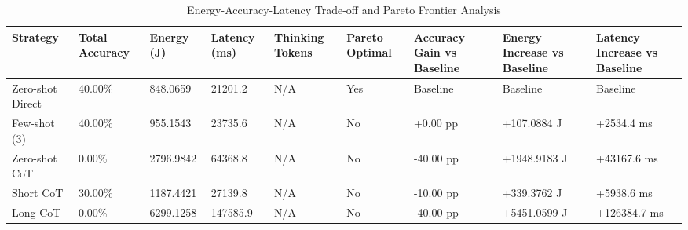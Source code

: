\begin{table}
\caption{Energy-Accuracy-Latency Trade-off and Pareto Frontier Analysis}
\label{tab:tradeoff_comparison}
\begin{tabular}{lllllllll}
\toprule
Strategy & Total Accuracy & Energy (J) & Latency (ms) & Thinking Tokens & Pareto Optimal & Accuracy Gain vs Baseline & Energy Increase vs Baseline & Latency Increase vs Baseline \\
\midrule
Zero-shot Direct & 40.00\% & 848.0659 & 21201.2 & N/A & Yes & Baseline & Baseline & Baseline \\
Few-shot (3) & 40.00\% & 955.1543 & 23735.6 & N/A & No & +0.00 pp & +107.0884 J & +2534.4 ms \\
Zero-shot CoT & 0.00\% & 2796.9842 & 64368.8 & N/A & No & -40.00 pp & +1948.9183 J & +43167.6 ms \\
Short CoT & 30.00\% & 1187.4421 & 27139.8 & N/A & No & -10.00 pp & +339.3762 J & +5938.6 ms \\
Long CoT & 0.00\% & 6299.1258 & 147585.9 & N/A & No & -40.00 pp & +5451.0599 J & +126384.7 ms \\
\bottomrule
\end{tabular}
\end{table}
